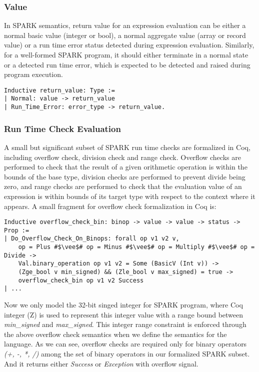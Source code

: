 \subsubsection{Value}
In SPARK semantics, return value for an expression evaluation can be either
a normal basic value (integer or bool), a normal aggregate value (array or
record value) or a run time error status detected during expression evaluation.
Similarly, for a well-formed SPARK program, it should either terminate in a
normal state or a detected run time error, which is expected to be detected and
raised during program execution.

\begin{lstlisting}[escapechar=\#, language=coq]
Inductive return_value: Type :=
| Normal: value -> return_value
| Run_Time_Error: error_type -> return_value.
\end{lstlisting}

\subsubsection{Run Time Check Evaluation}
A small but significant subset of SPARK run time checks are formalized in Coq,
including overflow check, division check and range check. Overflow checks are
performed to check that the result of a given orithmetic operation is within the
bounds of the base type, division checks are performed to prevent divide being
zero, and range checks are performed to check that the evaluation value of an
expression is within bounds of its target type with respect to the context where
it appears. A small fragment for overflow check formalization in Coq is:
\begin{lstlisting}[escapechar = \#, language=coq, basicstyle=\small]
Inductive overflow_check_bin: binop -> value -> value -> status -> Prop :=
| Do_Overflow_Check_On_Binops: forall op v1 v2 v, 
    op = Plus #$\vee$# op = Minus #$\vee$# op = Multiply #$\vee$# op = Divide ->
    Val.binary_operation op v1 v2 = Some (BasicV (Int v)) ->
    (Zge_bool v min_signed) && (Zle_bool v max_signed) = true ->  
    overflow_check_bin op v1 v2 Success
| ...
\end{lstlisting}
Now we only model the 32-bit singed integer for SPARK program, where Coq integer
(Z) is used to represent this integer value with a range bound between \textit{min\_signed}
and \textit{max\_signed}. This integer range constraint is enforced through
the above overflow check semantics when we define the semantics for the
language. As we can see, overflow checks are required only for binary operators
\textit{(+, -, *, /)} among the set of binary operators in our formalized SPARK
subset. And it returns either \textit{Success} or \textit{Exception} with
overflow signal.

